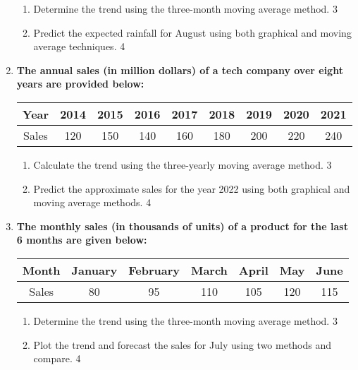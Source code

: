 \documentclass[a4paper,oneside]{book}
\begin{document}
\begin{enumerate}
\begin{enumerate}  
    \item  
    Determine the trend using the three-month moving average method. \hfill 3  
    \item  
    Predict the expected rainfall for August using both graphical and moving average techniques. \hfill 4  
\end{enumerate}  


\item
\textbf{The annual sales (in million dollars) of a tech company over eight years are provided below:}

\begin{table}[h]
\centering
\begin{tabular}{ccccccccc}
Year     & 2014 & 2015 & 2016 & 2017 & 2018 & 2019 & 2020 & 2021 \\ \hline
Sales    & 120  & 150  & 140  & 160  & 180  & 200  & 220  & 240   
\end{tabular}
\end{table}

\begin{enumerate}
    \item  
    Calculate the trend using the three-yearly moving average method. \hfill 3
    \item
    Predict the approximate sales for the year 2022 using both graphical and moving average methods. \hfill 4
\end{enumerate}
  
  \item
\textbf{The monthly sales (in thousands of units) of a product for the last 6 months are given below:}

\begin{table}[h]
\centering
\begin{tabular}{ccccccc}
Month     & January & February & March & April & May & June \\ \hline
Sales     & 80      & 95       & 110   & 105   & 120  & 115  \\
\end{tabular}
\end{table}

\begin{enumerate}
\item
Determine the trend using the three-month moving average method. \hfill 3
\item
Plot the trend and forecast the sales for July using two methods 
and compare. \hfill 4
\end{enumerate}


\end{enumerate}
\end{document}
